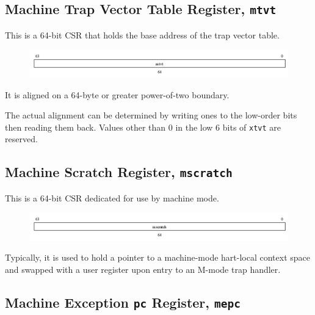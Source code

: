 \subsection{Machine Trap Vector Table Register, \texttt{mtvt}}
\label{subsec:mtvt}

This is a 64-bit CSR that holds the base address of the trap vector table.

\vspace{0.5cm}
\begin{figure}[H]
    \centering
    \includegraphics[width = 15.25cm]{images/csr_mtvt.png}
    \label{fig:csr_mtvt}
\end{figure}
\vspace{0.25cm}

It is aligned on a 64-byte or greater power-of-two boundary. 

The actual alignment can be determined by writing ones to the low-order bits then reading them back. Values other than 0 in the low 6 bits of \texttt{xtvt} are reserved.

\subsection{Machine Scratch Register, \texttt{mscratch}}
\label{subsec:mscratch}

This is a 64-bit CSR dedicated for use by machine mode.

\vspace{0.5cm}
\begin{figure}[H]
    \centering
    \includegraphics[width = 15.25cm]{images/csr_mscratch.png}
    \label{fig:csr_mscratch}
\end{figure}
\vspace{0.25cm}

Typically, it is used to hold a pointer to a machine-mode hart-local context space and swapped with a user register upon entry to an M-mode trap handler.

\subsection{Machine Exception \texttt{pc} Register, \texttt{mepc}}
\label{subsec:mepc}

